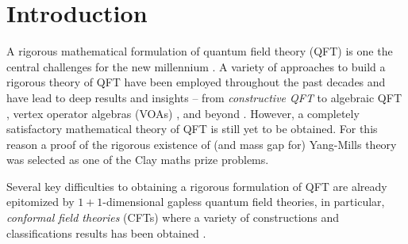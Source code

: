 \documentclass[a4paper, 11pt]{article}
\DeclareMathOperator{\1}{\mathds{1}}
\begin{document}
\tableofcontents

\section{Introduction}
\label{sec:intro}

A rigorous mathematical formulation of quantum field theory (QFT) is one the central challenges for the new millennium \cite{seibergNathanSeiberg20152014}. A variety of approaches to build a rigorous theory of QFT have been employed throughout the past decades and have lead to deep results and insights -- from \emph{constructive QFT} \cite{GlimmQuantumFieldTheory, glimmQuantumPhysicsFunctional1987, SummersAPerspectiveOn} to algebraic QFT \cite{HaagAnAlgebraicApproach, LechnerConstructionOfQuantum, BahnsLocalNetOf}, vertex operator algebras (VOAs) \cite{BorcherdsVertexAlgebrasKac, FrenkelVertexOperatorAlgebras, FrenkelBasicRepresentationsOf, TenerGeometricRealizationOf}, and beyond \cite{segalDefinitionConformalField2004, GrosseSolutionOfThe, GubinelliAPDEConstruction}. However, a completely satisfactory mathematical theory of QFT is still yet to be obtained. For this reason a proof of the rigorous existence of (and mass gap for) Yang-Mills theory was selected as one of the Clay maths prize problems. 

Several key difficulties to obtaining a rigorous formulation of QFT are already epitomized by $1+1$-dimensional gapless quantum field theories, in particular, \emph{conformal field theories} (CFTs) where a variety of constructions and classifications results has been obtained \cite{BelavinInfiniteConformalSymmetry, DiFrancescoCFTBook, EvansQuantumSymmetriesOn, WassermannOperatorAlgebrasAnd, BrunettiModularStructureAnd, GabbianiOperatorAlgebrasAnd, BuchholzTheCurrentAlgebra, KawahigashiClassificationOfLocal, CarpiFromVertexOperator}. 
\end{document}
